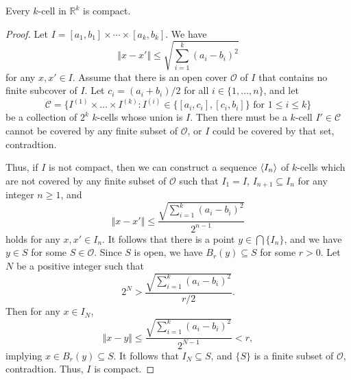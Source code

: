 \begin{theorem}
  Every $k$-cell in $\mathbb{R}^k$ is compact.
\end{theorem}
\begin{proof}
  Let $I = [a_1, b_1] \times \cdots \times [a_k, b_k]$.
  We have
  \begin{equation*}
    \Vert x - x' \Vert \leq \sqrt{\textstyle \sum_{i=1}^k (a_i - b_i)^2}
  \end{equation*}
  for any $x, x' \in I$.
  Assume that there is an open cover $\mathcal{O}$ of $I$ that contains no
  finite subcover of $I$.
  Let $c_i = (a_i + b_i) / 2$ for all $i \in \{1, \dots, n\}$, and let
  \begin{equation*}
    \mathcal{C} = \{I^{(1)} \times \dots \times I^{(k)}:
    \text{$I^{(i)} \in \{[a_i, c_i], [c_i, b_i]\}$ for $1 \leq i \leq k$}\}
  \end{equation*}
  be a collection of $2^k$ $k$-cells whose union is $I$.
  Then there must be a $k$-cell $I' \in \mathcal{C}$ cannot be covered by any
  finite subset of $\mathcal{O}$, or $I$ could be covered by that set,
  contradtion.

  Thus, if $I$ is not compact, then we can construct a sequence $\left\langle I_n\right\rangle$ of
  $k$-cells which are not covered by any finite subset of $\mathcal{O}$ such
  that $I_1 = I$, $I_{n+1} \subseteq I_n$ for any integer $n \geq 1$, and
  \begin{equation*}
    \Vert x - x' \Vert \leq \frac{\sqrt{\sum_{i=1}^k (a_i - b_i)^2}}{2^{n-1}}
  \end{equation*}
  holds for any $x, x' \in I_n$.
  It follows that there is a point $y \in \bigcap \{I_n\}$, and we have
  $y \in S$ for some $S \in \mathcal{O}$.
  Since $S$ is open, we have $B_r(y) \subseteq S$ for some $r > 0$.
  Let $N$ be a positive integer such that
  \begin{equation*}
    2^N > \frac{\sqrt{\sum_{i=1}^k (a_i - b_i)^2}}{r/2}.
  \end{equation*}
  Then for any $x \in I_N$,
  \begin{equation*}
    \Vert x - y \Vert
    \leq \frac{\sqrt{\sum_{i=1}^k (a_i - b_i)^2}}{2^{N-1}}
    < r,
  \end{equation*}
  implying $x \in B_r(y) \subseteq S$.
  It follows that $I_N \subseteq S$, and $\{S\}$ is a finite subset of
  $\mathcal{O}$, contradtion.
  Thus, $I$ is compact.
\end{proof}

